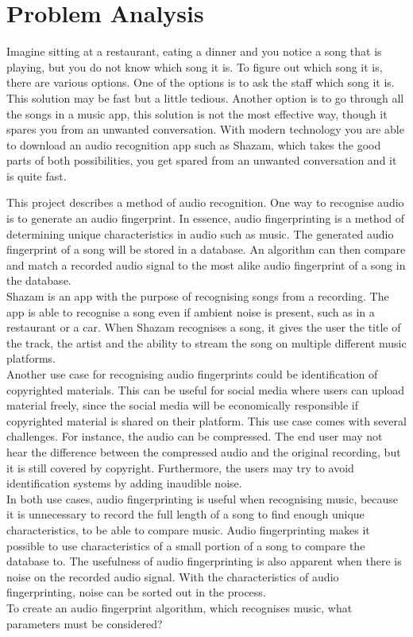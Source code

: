 \chapter{Problem Analysis}
Imagine sitting at a restaurant, eating a dinner and you notice a song that is playing, but you do not know which song it is. To figure out which song it is, there are various options. One of the options is to ask the staff which song it is. This solution may be fast but a little tedious. Another option is to go through all the songs in a music app, this solution is not the most effective way, though it spares you from an unwanted conversation. With modern technology you are able to download an audio recognition app such as Shazam, which takes the good parts of both possibilities, you get spared from an unwanted conversation and it is quite fast.

\noindent This project describes a method of audio recognition. One way to recognise audio is to generate an audio fingerprint. In essence, audio fingerprinting is a method of determining unique characteristics in audio such as music. The generated audio fingerprint of a song will be stored in a database. An algorithm can then compare and match a recorded audio signal to the most alike audio fingerprint of a song in the database.\\ 

\indent Shazam is an app with the purpose of recognising songs from a recording. The app is able to recognise a song even if ambient noise is present, such as in a restaurant or a car. When Shazam recognises a song, it gives the user the title of the track, the artist and the ability to stream the song on multiple different music platforms. \cite{ShazamDescription} \\

\indent Another use case for recognising audio fingerprints could be identification of copyrighted materials. This can be useful for social media where users can upload material freely, since the social media will be economically responsible if copyrighted material is shared on their platform. This use case comes with several challenges. For instance, the audio can be compressed. The end user may not hear the difference between the compressed audio and the original recording, but it is still covered by copyright. Furthermore, the users may try to avoid identification systems by adding inaudible noise. \cite{haitsma2003highly}\\
In both use cases, audio fingerprinting is useful when recognising music, because it is unnecessary to record the full length of a song to find enough unique characteristics, to be able to compare music. Audio fingerprinting makes it possible to use characteristics of a small portion of a song to compare the database to. 
The usefulness of audio fingerprinting is also apparent when there is noise on the recorded audio signal. With the characteristics of audio fingerprinting, noise can be sorted out in the process.\\
\noindent To create an audio fingerprint algorithm, which recognises music, what parameters must be considered?

